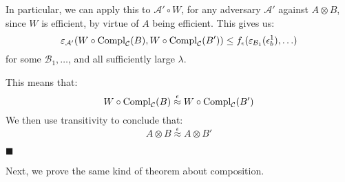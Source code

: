 \begin{lemma}
    In particular, we can apply this to $\mathcal{A}' \circ W$, for any
    adversary $\mathcal{A}'$ against $A \otimes B$,
    since $W$ is efficient, by virtue of $A$ being efficient.
    This gives us:
    $$
    \varepsilon_{\mathcal{A}'}(W \circ \text{Compl}_{\mathcal{C}}(B), W \circ \text{Compl}_{\mathcal{C}}(B')) \leq f_\epsilon(\varepsilon_{\mathcal{B}_1}(\epsilon^1_b), \ldots)
    $$
    for some $\mathcal{B}_1, \ldots$, and all sufficiently large $\lambda$.

    This means that:
    $$
    W \circ \text{Compl}_{\mathcal{C}}(B) \overset{\epsilon}{\approx} W \circ \text{Compl}_{\mathcal{C}}(B')
    $$
    We then use transitivity to conclude that:
    $$
    A \otimes B \overset{\epsilon}{\approx} A \otimes B'
    $$

    $\blacksquare$
\end{lemma}

Next, we prove the same kind of theorem about composition.

